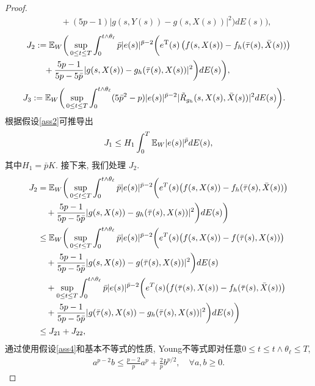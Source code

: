 \begin{proof}
\begin{align*}
    &\quad+(5p-1)|g(s,Y(s))-g(s,X(s))|^2\bigg)dE(s)\bigg),
\end{align*}
\begin{align*}
    J_2&:=\mathbb{E}_W\bigg(\sup_{0\leq t\leq T}\int^{t\wedge\theta_{\ell}}_{0}\bar{p}|e(s)|^{\bar{p}-2}\bigg(e^{\mathrm{T}}(s)\left(f(s,X(s))-f_{h}(\bar{\tau}(s),\bar{X}(s))\right)\\
    &\quad+\frac{5p-1}{5p-5\bar{p}}|g(s,X(s))-g_{h}(\bar{\tau}(s),X(s))|^2\bigg)dE(s)\bigg),
\end{align*}
\begin{align*}
    \begin{split}
        J_3&:=\mathbb{E}_W\bigg(\sup_{0\leq t\leq T}\int^{t\wedge\theta_{\ell}}_{0}(5\bar{p}^{2}-p)|e(s)|^{\bar{p}-2}|\tilde{R}_{g_h}(s,X(s),\bar{X}(s))|^2dE(s)\bigg).
    \end{split}
\end{align*}
根据假设\ref{ass2}可推导出
\begin{align}
    \label{J1}
    J_1\leq H_1\int^{T}_{0}\mathbb{E}_W|e(s)|^{\bar{p}}dE(s),
\end{align}
其中$H_1=\bar{p}K$. 接下来, 我们处理 $J_{2}$.
\begin{align}
    \label{lemm330}
    J_2&= \mathbb{E}_W\bigg(\sup_{0\leq t\leq T}\int^{t\wedge\theta_{\ell}}_{0}\bar{p}|e(s)|^{\bar{p}-2}\bigg(e^{T}(s)\big(f(s,X(s))-f_h(\bar{\tau}(s),\bar{X}(s))\big)\nonumber\\
    &\quad+\dfrac{5p-1}{5p-5\bar{p}}|g(s,X(s))-g_h(\bar{\tau}(s),X(s))|^2\bigg)dE(s)\bigg)\nonumber\\
    &\leq \mathbb{E}_W\bigg(\sup_{0\leq t\leq T}\int^{t\wedge\theta_{\ell}}_{0}\bar{p}|e(s)|^{\bar{p}-2}\bigg(e^{T}(s)\big(f(s,X(s))-f(\bar{\tau}(s),X(s))\big)\nonumber\\
    &\quad+\dfrac{5p-1}{5p-5\bar{p}}|g(s,X(s))-g(\bar{\tau}(s),X(s))|^2\bigg)dE(s)\nonumber\\
    &\quad+\sup_{0\leq t\leq T}\int^{t\wedge\theta_{\ell}}_{0}\bar{p}|e(s)|^{\bar{p}-2}\bigg(e^{T}(s)\big(f(\bar{\tau}(s),X(s))-f_h(\bar{\tau}(s),\bar{X}(s))\big)\nonumber\\
    &\quad+\dfrac{5p-1}{5p-5\bar{p}}|g(\bar{\tau}(s),X(s))-g_h(\bar{\tau}(s),X(s))|^2\bigg)dE(s)\bigg)\nonumber\\
    &\leq J_{21}+J_{22},
\end{align}
通过使用假设\ref{ass4}和基本不等式的性质, Young不等式即对任意$0\leq t\leq t\wedge\theta_{\ell}\leq T $,
\begin{align*}
    a^{p-2}b\leq \frac{p-2}{p}a^p + \frac{2}{p}b^{p/2},\quad \forall a,b \geq 0.

\end{align*}
\end{proof}
